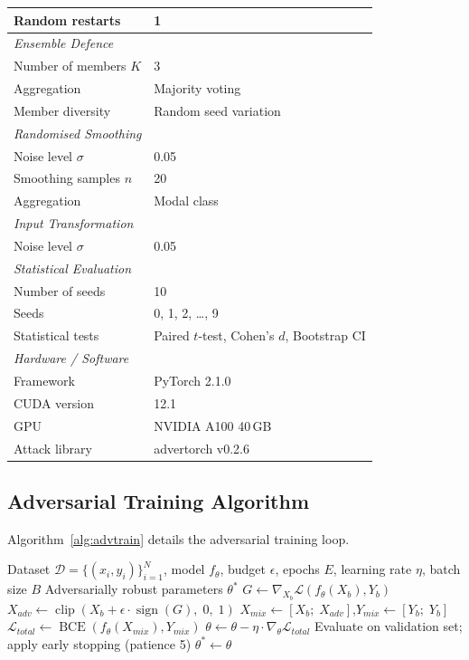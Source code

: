 \documentclass[conference]{IEEEtran}
\begin{document}
\begin{table}[htbp]
\begin{tabular}{lp{4.0cm}}
Random restarts & 1 \\
\midrule
\multicolumn{2}{l}{\textit{Ensemble Defence}} \\
Number of members $K$ & 3 \\
Aggregation & Majority voting \\
Member diversity & Random seed variation \\
\midrule
\multicolumn{2}{l}{\textit{Randomised Smoothing}} \\
Noise level $\sigma$ & 0.05 \\
Smoothing samples $n$ & 20 \\
Aggregation & Modal class \\
\midrule
\multicolumn{2}{l}{\textit{Input Transformation}} \\
Noise level $\sigma$ & 0.05 \\
\midrule
\multicolumn{2}{l}{\textit{Statistical Evaluation}} \\
Number of seeds & 10 \\
Seeds & 0, 1, 2, \ldots, 9 \\
Statistical tests & Paired $t$-test, Cohen's $d$, Bootstrap CI \\
\midrule
\multicolumn{2}{l}{\textit{Hardware / Software}} \\
Framework & PyTorch 2.1.0 \\
CUDA version & 12.1 \\
GPU & NVIDIA A100 40\,GB \\
Attack library & advertorch v0.2.6 \\
\bottomrule
\end{tabular}
\end{table}

\subsection{Adversarial Training Algorithm}

Algorithm~\ref{alg:advtrain} details the adversarial training loop.

\begin{algorithm}[htbp]
\caption{Adversarial Training for Robust Malware Detection}
\label{alg:advtrain}
\begin{algorithmic}[1]
\REQUIRE Dataset $\mathcal{D} = \{(x_i, y_i)\}_{i=1}^{N}$, model $f_\theta$, budget $\epsilon$, epochs $E$, learning rate $\eta$, batch size $B$
\ENSURE Adversarially robust parameters $\theta^*$
    \STATE $G \leftarrow \nabla_{X_b} \mathcal{L}(f_\theta(X_b), Y_b)$
    \STATE $X_{adv} \leftarrow \operatorname{clip}(X_b + \epsilon \cdot \operatorname{sign}(G),\; 0,\; 1)$
    \STATE $X_{mix} \leftarrow [X_b;\; X_{adv}]$,\quad $Y_{mix} \leftarrow [Y_b;\; Y_b]$
    \STATE $\mathcal{L}_{total} \leftarrow \operatorname{BCE}(f_\theta(X_{mix}), Y_{mix})$
    \STATE $\theta \leftarrow \theta - \eta \cdot \nabla_\theta \mathcal{L}_{total}$
  \ENDFOR
  \STATE Evaluate on validation set; apply early stopping (patience 5)
\ENDFOR
\RETURN $\theta^* \leftarrow \theta$
\end{algorithmic}
\end{algorithm}
\end{document}
